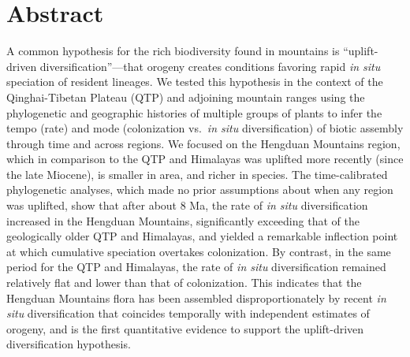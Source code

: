 \section*{Abstract}

A common hypothesis for the rich biodiversity found in mountains is
``uplift-driven diversification''---that orogeny creates conditions
favoring rapid \textit{in situ} speciation of resident lineages. We
tested this hypothesis in the context of the Qinghai-Tibetan Plateau
(QTP) and adjoining mountain ranges using the phylogenetic and
geographic histories of multiple groups of plants to infer the tempo
(rate) and mode (colonization vs.\ \textit{in situ} diversification)
of biotic assembly through time and across regions. We focused on the
Hengduan Mountains region, which in comparison to the QTP and
Himalayas was uplifted more recently (since the late Miocene), is
smaller in area, and richer in species. The time-calibrated
phylogenetic analyses, which made no prior assumptions about when any
region was uplifted, show that after about 8 Ma, the rate of
\textit{in situ} diversification increased in the Hengduan Mountains,
significantly exceeding that of the geologically older QTP and
Himalayas, and yielded a remarkable inflection point at which
cumulative speciation overtakes colonization. By contrast, in the same
period for the QTP and Himalayas, the rate of \textit{in situ}
diversification remained relatively flat and lower than that of
colonization. This indicates that the Hengduan Mountains flora has
been assembled disproportionately by recent \textit{in situ}
diversification that coincides temporally with independent estimates
of orogeny, and is the first quantitative evidence to support the
uplift-driven diversification hypothesis.

